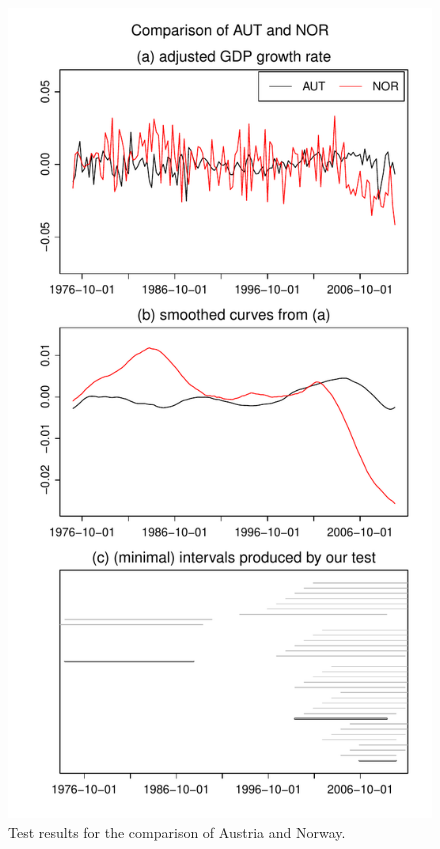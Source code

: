 \documentclass[a4paper,12pt]{article}
\begin{document}
\begin{figure}
\begin{minipage}[t]{0.24\textwidth}
\end{minipage}
\hspace{0.1cm}
\begin{minipage}[t]{0.24\textwidth}
\includegraphics[width=\textwidth]{output/plots/gdp/AUT_vs_NOR}
\caption{Test results for the comparison of Austria and Norway.}\label{fig:Austria:Norway}
\end{minipage}

\end{figure}
\end{document}
